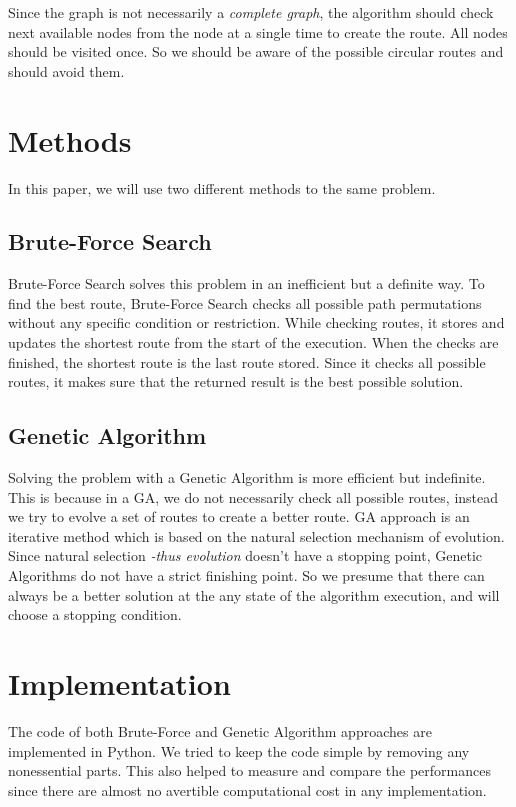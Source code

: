\documentclass[journal,transmag]{IEEEtran}
\begin{document}
    Since the graph is not necessarily a \textit{complete graph}, the algorithm should check next
    available nodes from the node at a single time to create the route. All nodes should be visited
    once. So we should be aware of the possible circular routes and should avoid them.

    \section{Methods}
    In this paper, we will use two different methods to the same problem.

    \subsection{Brute-Force Search}
    Brute-Force Search solves this problem in an inefficient but a definite way. To find the best
    route, Brute-Force Search checks all possible path permutations without any specific condition
    or restriction. While checking routes, it stores and updates the shortest route from the start
    of the execution. When the checks are finished, the shortest route is the last route stored.
    Since it checks all possible routes, it makes sure that the returned result is the best possible
    solution.

    \subsection{Genetic Algorithm}
    Solving the problem with a Genetic Algorithm is more efficient but indefinite. This is because in
    a GA, we do not necessarily check all possible routes, instead we try to evolve a set of routes to
    create a better route. GA approach is an iterative method which is based on the natural selection
    mechanism of evolution. Since natural selection \textit{-thus evolution} doesn't have a stopping
    point, Genetic Algorithms do not have a strict finishing point. So we presume that there can always
    be a better solution at the any state of the algorithm execution, and will choose a stopping condition.


    \section{Implementation}
    The code \cite{code_repository} of both Brute-Force and Genetic Algorithm approaches are implemented
    in Python. We tried to keep the code simple by removing any nonessential parts. This also helped to
    measure and compare the performances since there are almost no avertible computational cost in any
    implementation.
\end{document}
